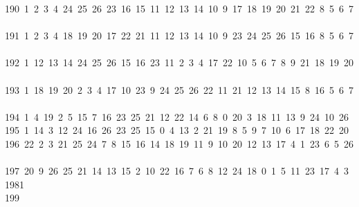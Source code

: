 \begin{tabbing}
190\ 1\ 2\ 3\ 4\ 24\ 25\ 26\ 23\ 16\ 15\ 11\ 12\ 13\ 14\ 10\ 9\ 17\ 18\ 19\ 20\ 21\ 22\ 8\ 5\ 6\ 7\ \\[0pt]
191\ 1\ 2\ 3\ 4\ 18\ 19\ 20\ 17\ 22\ 21\ 11\ 12\ 13\ 14\ 10\ 9\ 23\ 24\ 25\ 26\ 15\ 16\ 8\ 5\ 6\ 7\ \\[0pt]
192\ 1\ 12\ 13\ 14\ 24\ 25\ 26\ 15\ 16\ 23\ 11\ 2\ 3\ 4\ 17\ 22\ 10\ 5\ 6\ 7\ 8\ 9\ 21\ 18\ 19\ 20\ \\[0pt]
193\ 1\ 18\ 19\ 20\ 2\ 3\ 4\ 17\ 10\ 23\ 9\ 24\ 25\ 26\ 22\ 11\ 21\ 12\ 13\ 14\ 15\ 8\ 16\ 5\ 6\ 7\ \\[0pt]
194\ 1\ 4\ 19\ 2\ 5\ 15\ 7\ 16\ 23\ 25\ 21\ 12\ 22\ 14\ 6\ 8\ 0\ 20\ 3\ 18\ 11\ 13\ 9\ 24\ 10\ 26\ \\[0pt]
195\ 1\ 14\ 3\ 12\ 24\ 16\ 26\ 23\ 25\ 15\ 0\ 4\ 13\ 2\ 21\ 19\ 8\ 5\ 9\ 7\ 10\ 6\ 17\ 18\ 22\ 20\ \\[0pt]
196\ 22\ 2\ 3\ 21\ 25\ 24\ 7\ 8\ 15\ 16\ 14\ 18\ 19\ 11\ 9\ 10\ 20\ 12\ 13\ 17\ 4\ 1\ 23\ 6\ 5\ 26\ \\[0pt]
197\ 20\ 9\ 26\ 25\ 21\ 14\ 13\ 15\ 2\ 10\ 22\ 16\ 7\ 6\ 8\ 12\ 24\ 18\ 0\ 1\ 5\ 11\ 23\ 17\ 4\ 3\ \\[0pt]
198\>1\\[0pt]
199\>\end{tabbing}
